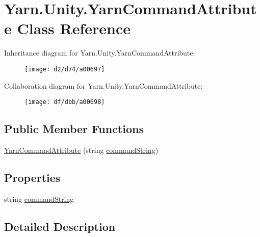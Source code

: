 \hypertarget{a00169}{\section{Yarn.\-Unity.\-Yarn\-Command\-Attribute Class Reference}
\label{a00169}
}


Inheritance diagram for Yarn.\-Unity.\-Yarn\-Command\-Attribute\-:
\nopagebreak
\begin{figure}[H]
\begin{center}
\leavevmode
\texttt{[image: d2/d74/a00697]}
\end{center}
\end{figure}


Collaboration diagram for Yarn.\-Unity.\-Yarn\-Command\-Attribute\-:
\nopagebreak
\begin{figure}[H]
\begin{center}
\leavevmode
\texttt{[image: df/dbb/a00698]}
\end{center}
\end{figure}
\subsection*{Public Member Functions}
\begin{DoxyCompactItemize}
\item 
\hyperlink{a00169_a9c0d57cd72c091f63895944959e98330}{Yarn\-Command\-Attribute} (string \hyperlink{a00169_a6d513a725c819ffcdaa9c5788472ec8d}{command\-String})
\end{DoxyCompactItemize}
\subsection*{Properties}
\begin{DoxyCompactItemize}
\item 
string \hyperlink{a00169_a6d513a725c819ffcdaa9c5788472ec8d}{command\-String}
\end{DoxyCompactItemize}


\subsection{Detailed Description}



